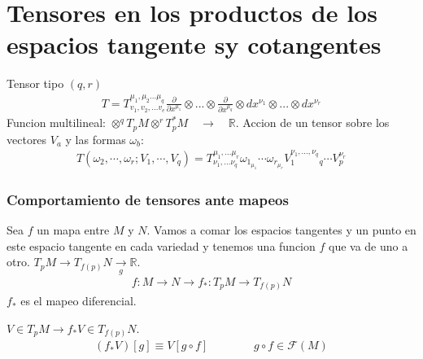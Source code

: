 \documentclass{article}
\begin{document}
\section{Tensores en los productos de los espacios tangente sy cotangentes }
Tensor tipo $ (q,r ) $
\begin{gather*}
  T = T ^ {\mu_1, \mu_2...\mu_q} _{v_1,v_2,...v_e } \frac{\partial  }{\partial x ^ {\mu_1 }} \otimes ... \otimes \frac{\partial  }{\partial x ^ {\mu_q }}\otimes dx ^ {\nu_1 } \otimes ... \otimes dx ^ {\nu _r }
\end{gather*}
Funcion multilineal: $ \otimes ^ {q } T_p M \otimes ^ {r }T _p ^ {* }M \quad \rightarrow \quad \mathbb{R} $.
Accion de un tensor sobre los vectores $ V_a  $ y las formas $ \omega_b  $:
\begin{gather*}
  T(\omega_2, \cdots, \omega_r; V_1, \cdots, V_q) = T ^ {\mu_1,...\mu_r} _{\nu_1,...\nu_q } \omega_{1}_{\mu_1} \cdots \omega _{r}_{\mu_r}  V_1 ^ {\nu_1,...,\nu_q }_{q } \cdots V_p ^ {\nu_r}
\end{gather*}
\subsubsection{Comportamiento de tensores ante mapeos }
Sea $ f  $ un mapa entre $ M  $ y $ N  $. Vamos a comar los espacios tangentes y un punto en este espacio tangente en cada variedad y tenemos una funcion $ f  $ que va de uno a otro. $ T_p M \rightarrow T _{f(p)} N  \underset{g }{\rightarrow  }\mathbb{R}$. 
\begin{gather*}
  f: M \rightarrow N \rightarrow f_* : T_p M \rightarrow T _{f (p) } N  
\end{gather*}
$ f_*  $ es el mapeo diferencial.

\hfill 

\hfill 

$ V \in T_p M \rightarrow f_* V \in T _{f(p)} N  $.
\begin{gather*}
  (f_* V )[g] \equiv V[g \circ f]\qquad \qquad g\circ f \in \mathcal F (M) 
\end{gather*}
\end{document}
